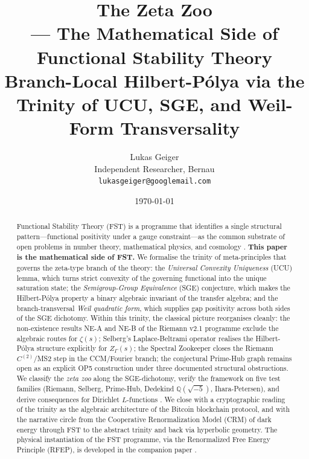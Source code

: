 \documentclass[11pt]{article}
\title{The Zeta Zoo\\
  \large --- The Mathematical Side of\\
  Functional Stability Theory\\[0.3em]
  \normalsize Branch-Local Hilbert-P\'olya via the Trinity
  of UCU, SGE, and Weil-Form Transversality}
\author{Lukas Geiger\\
  \small Independent Researcher, Bernau\\
  \small \texttt{lukasgeiger@googlemail.com}}
\date{\today}
\theoremstyle{definition}
\theoremstyle{remark}
\begin{document}
\maketitle

\begin{abstract}
\noindent
Functional Stability Theory (FST) is a programme that identifies a
single structural pattern---functional positivity under a gauge
constraint---as the common substrate of open problems in number
theory, mathematical physics, and cosmology \cite{RFEPFramework}.
\textbf{This paper is the mathematical side of FST.} We formalise
the trinity of meta-principles that governs the zeta-type branch of
the theory: the \emph{Universal Convexity Uniqueness} (UCU) lemma,
which turns strict convexity of the governing functional into the
unique saturation state; the \emph{Semigroup-Group Equivalence}
(SGE) conjecture, which makes the Hilbert-P\'olya property a binary
algebraic invariant of the transfer algebra; and the
branch-transversal \emph{Weil quadratic form}, which supplies gap
positivity across both sides of the SGE dichotomy. Within this
trinity, the classical picture reorganises cleanly: the
non-existence results NE-A and NE-B of the Riemann v2.1 programme
\cite{Geiger2026RHII} exclude the algebraic routes for $\zeta(s)$;
Selberg's Laplace-Beltrami operator realises the Hilbert-P\'olya
structure explicitly for $Z_\Gamma(s)$; the Spectral Zookeeper
\cite{Zookeeper2026} closes the Riemann $C^{(2)}$/MS2 step in the
CCM/Fourier branch; the conjectural Prime-Hub graph remains open as
an explicit OP5 construction under three documented structural
obstructions.
We classify the \emph{zeta zoo} along the SGE-dichotomy, verify the
framework on five test families (Riemann, Selberg, Prime-Hub,
Dedekind $\mathbb{Q}(\sqrt{-5})$, Ihara-Petersen), and derive
consequences for Dirichlet $L$-functions
\cite{PaleyWienerDirichlet, DirichletAtlas}. We close with a
cryptographic reading of the trinity as the algebraic architecture
of the Bitcoin blockchain protocol, and with the narrative circle
from the Cooperative Renormalization Model (CRM) of dark energy
through FST to the abstract trinity and back via hyperbolic
geometry. The physical instantiation of the FST programme, via the
Renormalized Free Energy Principle (RFEP), is developed in the
companion paper \cite{RFEPFramework}.
\end{abstract}

\clearpage
\tableofcontents
\clearpage

\end{document}
